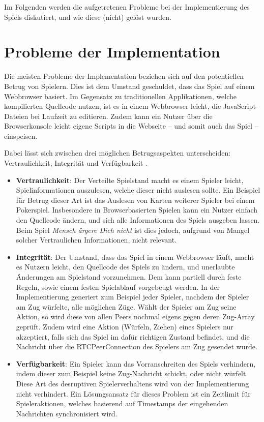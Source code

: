 Im Folgenden werden die aufgetretenen Probleme bei der Implementierung des Spiels diskutiert, und wie diese (nicht) gelöst wurden.

\section{Probleme der Implementation}
Die meisten Probleme der Implementation beziehen sich auf den potentiellen Betrug von Spielern. Dies ist dem Umstand geschuldet, dass das Spiel auf einem Webbrowser basiert. Im Gegensatz zu \glqq{}traditionellen\grqq{} Applikationen, welche kompilierten Quellcode nutzen, ist es in einem Webbrowser leicht, die JavaScript-Dateien bei Laufzeit zu editieren. Zudem kann ein Nutzer über die Browserkonsole leicht eigene Scripts in die Webseite -- und somit auch das Spiel -- einspeisen.\par

Dabei lässt sich zwischen drei möglichen Betrugsaspekten unterscheiden: Vertraulichkeit, Integrität und Verfügbarkeit \cite{p2pchallenges}.
\begin{itemize}
\item \textbf{Vertraulichkeit}: Der Verteilte Spielstand macht es einem Spieler leicht, Spielinformationen auszulesen, welche dieser nicht auslesen sollte. Ein Beispiel für Betrug dieser Art ist das Auslesen von Karten weiterer Spieler bei einem Pokerspiel. Insbesondere in Browserbasierten Spielen kann ein Nutzer einfach den Quellcode ändern, und sich alle Informationen des Spiels ausgeben lassen. Beim Spiel \textit{Mensch ärgere Dich nicht} ist dies jedoch, aufgrund von Mangel solcher Vertraulichen Informationen, nicht relevant.

\item \textbf{Integrität}: Der Umstand, dass das Spiel in einem Webbrowser läuft, macht es Nutzern leicht, den Quellcode des Spiels zu ändern, und unerlaubte Änderungen am Spielstand vorzunehmen. Dem kann partiell durch feste Regeln, sowie einem festen Spielablauf vorgebeugt werden. In der Implementierung generiert zum Beispiel jeder Spieler, nachdem der Spieler am Zug würfelte, alle möglichen Züge. Wählt der Spieler am Zug seine Aktion, so wird diese von allen Peers nochmal eigens gegen deren Zug-Array geprüft. Zudem wird eine Aktion (Würfeln, Ziehen) eines Spielers  nur akzeptiert, falls sich das Spiel im dafür richtigen Zustand befindet, und die Nachricht über die RTCPeerConnection des Spielers am Zug gesendet wurde.

\item \textbf{Verfügbarkeit}: Ein Spieler kann das Vorranschreiten des Spiels verhindern, indem dieser zum Beispiel keine Zug-Nachricht schickt, oder nicht würfelt. Diese Art des desruptiven Spielerverhaltens wird von der Implementierung nicht verhindert. Ein Lösungsansatz für dieses Problem ist ein Zeitlimit für Spieleraktionen, welches basierend auf Timestamps der eingehenden Nachrichten synchronisiert wird.
\end{itemize}

